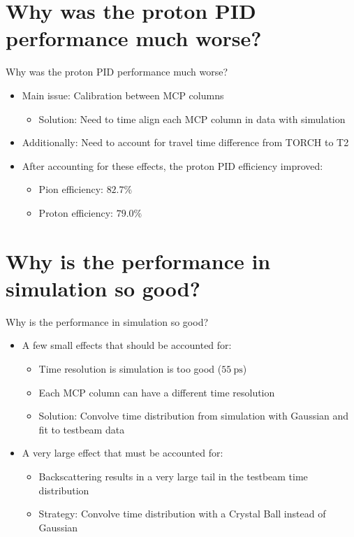 \documentclass{beamer}
\begin{document}
\section{Why was the proton PID performance much worse?}
\begin{frame}{Why was the proton PID performance much worse?}
  \begin{itemize}
    \setlength\itemsep{1.0em}
    \item{Main issue: Calibration between MCP columns}
    \begin{itemize}
      \item{Solution: Need to time align each MCP column in data with simulation}
    \end{itemize}
    \item{Additionally: Need to account for travel time difference from TORCH to T2}
    \item{After accounting for these effects, the proton PID efficiency improved:}
    \begin{itemize}
      \item{Pion efficiency: $82.7\%$}
      \item{Proton efficiency: $79.0\%$}
    \end{itemize}
  \end{itemize}
\end{frame}


\section{Why is the performance in simulation so good?}
\begin{frame}{Why is the performance in simulation so good?}
  \begin{itemize}
    \setlength\itemsep{1.0em}
    \item{A few small effects that should be accounted for:}
    \begin{itemize}
      \item{Time resolution is simulation is too good ($\SI{55}{\pico\second}$)}
      \item{Each MCP column can have a different time resolution}
      \item{Solution: Convolve time distribution from simulation with Gaussian and fit to testbeam data}
    \end{itemize}
    \item{A very large effect that must be accounted for:}
    \begin{itemize}
      \item{Backscattering results in a very large tail in the testbeam time distribution}
      \item{Strategy: Convolve time distribution with a Crystal Ball instead of Gaussian}
    \end{itemize}
  \end{itemize}
\end{frame}
\end{document}
